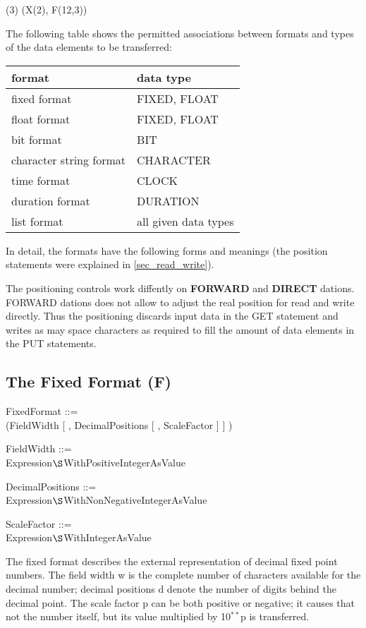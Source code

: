 (3) (X(2), F(12,3))

The following table shows the permitted associations between formats and
types of the data elements to be transferred:

\begin{tabular}{ll}
format                  & data type \\ \hline
fixed format            & FIXED, FLOAT \\
float format            & FIXED, FLOAT \\
bit format              & BIT          \\
character string format & CHARACTER    \\
time format             & CLOCK        \\
duration format         & DURATION     \\
list format             & all given data types
\end{tabular}

In detail, the formats have the following forms and meanings (the
position statements were explained in \ref{sec_read_write}).

\begin{added}
The positioning controls work diffently on {\bf FORWARD} and {\bf DIRECT}
dations. FORWARD dations does not allow to adjust the real position for read
and write directly. 
Thus the positioning discards input data in the GET statement and 
writes as may space characters as required to fill the amount of data elements
in the PUT statements.
\end{added}


\subsection{The Fixed Format (F)}   %
\label{sec_dation_f_format}

FixedFormat ::=\\
 (FieldWidth [ , DecimalPositions [ , ScaleFactor ] ] )

FieldWidth ::=\\
\x Expression$\S $WithPositiveIntegerAsValue

DecimalPositions ::=\\
\x Expression$\S $WithNonNegativeIntegerAsValue

ScaleFactor ::=\\
\x Expression$\S $WithIntegerAsValue

The fixed format describes the external representation of decimal fixed
point numbers. The field width w is the complete number of characters
available for the decimal number; decimal positions d denote the number
of digits behind the decimal point. The scale factor p can be both
positive or negative; it causes that not the number itself, but its
value multiplied by 10$^{**}$p is transferred.


